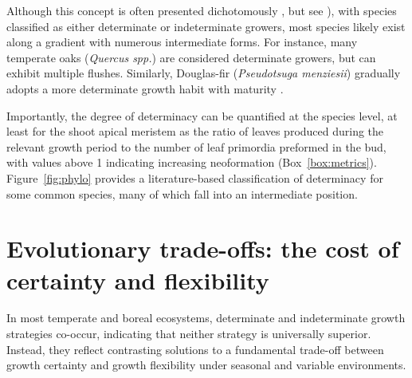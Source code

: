 \documentclass{article}
\begin{document}
	
	

	
Although this concept is often presented dichotomously \citep{kozlowskiGrowthControlWoody1997, lechowiczWhyTemperateDeciduous1984a}, but see \citealp{kikuzawaLeafSurvivalWoody1983, damascosBudCompositionBranching2005}), with species classified as either determinate or indeterminate growers, most species likely exist along a gradient with numerous intermediate forms. For instance, many temperate oaks (\textit{Quercus spp.}) are considered determinate growers, but can exhibit multiple flushes. Similarly, Douglas-fir (\textit{Pseudotsuga menziesii}) gradually adopts a more determinate growth habit with maturity \citep{borchertConceptJuvenilityWoody1976, heuretOntogeneticTrendsMorphological2006}.

 Importantly, the degree of determinacy can be quantified at the species level, at least for the shoot apical meristem as the ratio of leaves produced during the relevant growth period to the number of leaf primordia preformed in the bud, with values above 1 indicating increasing neoformation (Box~\ref{box:metrics}). Figure~\ref{fig:phylo} provides a literature-based classification of determinacy for some common species, many of which fall into an intermediate position.\\


								
								
	\section*{Evolutionary trade-offs: the cost of certainty and flexibility}
In most temperate and boreal ecosystems, determinate and indeterminate growth strategies co-occur, indicating that neither strategy is universally superior. Instead, they reflect contrasting solutions to a fundamental trade-off between growth certainty and growth flexibility under seasonal and variable environments.\\ 
\end{document}
